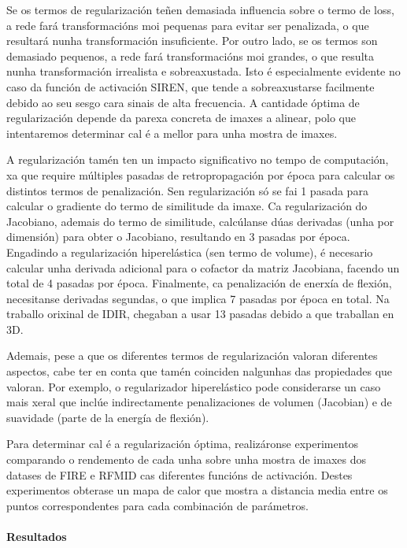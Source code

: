 Se os termos de regularización teñen demasiada influencia sobre o termo de loss, a rede fará transformacións moi pequenas para evitar ser penalizada, o que resultará nunha transformación insuficiente.
Por outro lado, se os termos son demasiado pequenos, a rede fará transformacións moi grandes, o que resulta nunha transformación irrealista e sobreaxustada. Isto é especialmente evidente no caso da función de activación SIREN, que tende a sobreaxustarse facilmente debido ao seu sesgo cara sinais de alta frecuencia.
A cantidade óptima de regularización depende da parexa concreta de imaxes a alinear, polo que intentaremos determinar cal é a mellor para unha mostra de imaxes.

A regularización tamén ten un impacto significativo no tempo de computación, xa que require múltiples pasadas de retropropagación por época para calcular os distintos termos de penalización.
Sen regularización só se fai 1 pasada para calcular o gradiente do termo de similitude da imaxe.
Ca regularización do Jacobiano, ademais do termo de similitude, calcúlanse dúas derivadas (unha por dimensión) para obter o Jacobiano, resultando en 3 pasadas por época.
Engadindo a regularización hiperelástica (sen termo de volume), é necesario calcular unha derivada adicional para o cofactor da matriz Jacobiana, facendo un total de 4 pasadas por época.
Finalmente, ca penalización de enerxía de flexión, necesitanse derivadas segundas, o que implica 7 pasadas por época en total.
Na traballo orixinal de IDIR, chegaban a usar 13 pasadas debido a que traballan en 3D.

Ademais, pese a que os diferentes termos de regularización valoran diferentes aspectos, cabe ter en conta que tamén coinciden nalgunhas das propiedades que valoran.
Por exemplo, o regularizador hiperelástico pode considerarse un caso mais xeral que inclúe indirectamente penalizaciones de volumen (Jacobian) e de suavidade (parte de la energía de flexión).

Para determinar cal é a regularización óptima, realizáronse experimentos comparando o rendemento de cada unha sobre unha mostra de imaxes dos datases de FIRE e RFMID cas diferentes funcións de activación.
Destes experimentos obterase un mapa de calor que mostra a distancia media entre os puntos correspondentes para cada combinación de parámetros.

\paragraph{Resultados}
\label{par:Resultados}

